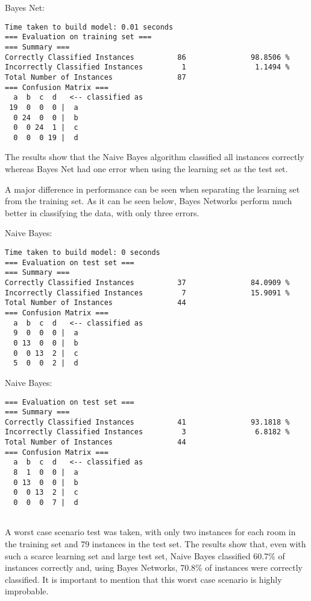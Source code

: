 \noindent Bayes Net:
\begin{lstlisting}
Time taken to build model: 0.01 seconds
=== Evaluation on training set ===
=== Summary ===
Correctly Classified Instances          86               98.8506 %
Incorrectly Classified Instances         1                1.1494 %
Total Number of Instances               87     
=== Confusion Matrix ===
  a  b  c  d   <-- classified as
 19  0  0  0 |  a
  0 24  0  0 |  b
  0  0 24  1 |  c
  0  0  0 19 |  d
\end{lstlisting}
The results show that the Naive Bayes algorithm classified all instances correctly whereas Bayes Net had one error when using the learning set as the test set.

A major difference in performance can be seen when separating the learning set from the training set. As it can be seen below, Bayes Networks perform much better in classifying the data, with only three errors.

\noindent Naive Bayes:
\begin{lstlisting}
Time taken to build model: 0 seconds
=== Evaluation on test set ===
=== Summary ===
Correctly Classified Instances          37               84.0909 %
Incorrectly Classified Instances         7               15.9091 %
Total Number of Instances               44     
=== Confusion Matrix ===
  a  b  c  d   <-- classified as
  9  0  0  0 |  a
  0 13  0  0 |  b
  0  0 13  2 |  c
  5  0  0  2 |  d
\end{lstlisting}

\noindent Naive Bayes:
\begin{lstlisting}
=== Evaluation on test set ===
=== Summary ===
Correctly Classified Instances          41               93.1818 %
Incorrectly Classified Instances         3                6.8182 %
Total Number of Instances               44     
=== Confusion Matrix ===
  a  b  c  d   <-- classified as
  8  1  0  0 |  a
  0 13  0  0 |  b
  0  0 13  2 |  c
  0  0  0  7 |  d


\end{lstlisting}

A worst case scenario test was taken, with only two instances for each room in the training set and 79 instances in the test set. The results show that, even with such a scarce learning set and large test set, Naive Bayes classified 60.7\% of instances correctly and, using Bayes Networks, 70.8\% of instances were correctly classified. It is important to mention that this worst case scenario is highly improbable.


